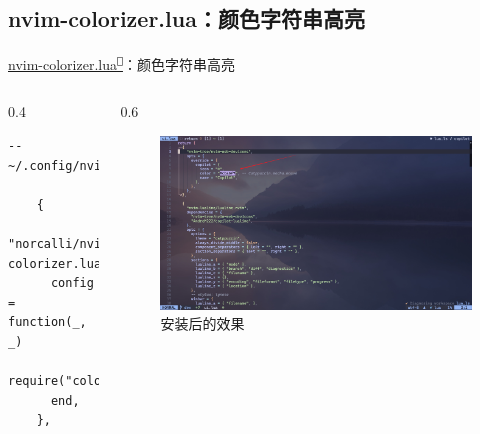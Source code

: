 \documentclass[aspectratio=169]{ctexbeamer}
\newcommand{\nerd}[1]{\texttt{#1}}
\newcommand{\link}[3][]{\href{#3}{#2\textsuperscript{\nerd{}}}}
\begin{document}
\subsection{nvim-colorizer.lua：颜色字符串高亮}
\begin{frame}[fragile]{\link{nvim-colorizer.lua}{https://github.com/norcalli/nvim-colorizer.lua}：颜色字符串高亮}
  \begin{columns}
    \begin{column}{0.4\linewidth}
        \begin{lstlisting}[basicstyle=\tiny\ttfamily]
    -- ~/.config/nvim/lua/plugins/ui.lua

    {
      "norcalli/nvim-colorizer.lua",
      config = function(_, _)
        require("colorizer").setup()
      end,
    },
        \end{lstlisting}
    \end{column}

    \begin{column}{0.6\linewidth}
      \begin{figure}[H]
        \centering
        \includegraphics[width=\linewidth]{./Figures/Colorizer_Finish.jpg}
        \caption{安装后的效果}%
      \end{figure}
    \end{column}
  \end{columns}
\end{frame}
\end{document}
